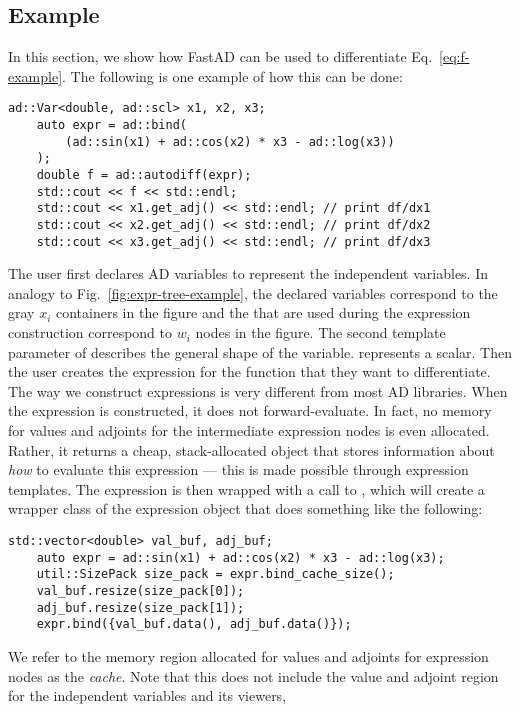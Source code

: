 \subsection{Example}\label{ssec:example}

In this section, we show how FastAD can be used to differentiate Eq.~\ref{eq:f-example}.
The following is one example of how this can be done:
\begin{lstlisting}[style=customcpp]
    ad::Var<double, ad::scl> x1, x2, x3;
    auto expr = ad::bind(
        (ad::sin(x1) + ad::cos(x2) * x3 - ad::log(x3))
    );
    double f = ad::autodiff(expr);
    std::cout << f << std::endl;
    std::cout << x1.get_adj() << std::endl; // print df/dx1
    std::cout << x2.get_adj() << std::endl; // print df/dx2
    std::cout << x3.get_adj() << std::endl; // print df/dx3
\end{lstlisting}
The user first declares AD variables to represent the independent variables.
In analogy to Fig.~\ref{fig:expr-tree-example}, the declared  variables
correspond to the gray $x_i$ containers in the figure and the 
that are used during the expression construction correspond to $w_i$ nodes in the figure.
The second template parameter of  describes the general shape of the variable.
 represents a scalar.
Then the user creates the expression for the function that they want to differentiate.
The way we construct expressions is very different from most AD libraries.
When the expression is constructed, it does not forward-evaluate.
In fact, no memory for values and adjoints for the intermediate expression nodes is even allocated.
Rather, it returns a cheap, stack-allocated object that stores information
about \emph{how} to evaluate this expression --- this is made possible through expression templates.
The expression is then wrapped with a call to ,
which will create a wrapper class of the expression object
that does something like the following:
\begin{lstlisting}[style=customcpp]
    std::vector<double> val_buf, adj_buf;
    auto expr = ad::sin(x1) + ad::cos(x2) * x3 - ad::log(x3);
    util::SizePack size_pack = expr.bind_cache_size();
    val_buf.resize(size_pack[0]);
    adj_buf.resize(size_pack[1]);
    expr.bind({val_buf.data(), adj_buf.data()});
\end{lstlisting}
We refer to the memory region allocated for values and adjoints for
expression nodes as the \emph{cache}.
Note that this does not include the value and adjoint region 
for the independent variables and its viewers,
